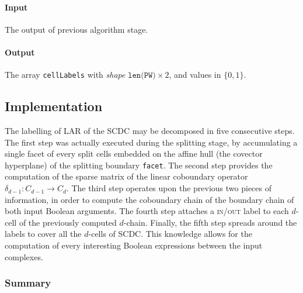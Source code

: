 \documentclass[11pt,oneside]{article}	%
\begin{document}
\paragraph{Input}
The output of previous algorithm stage.

\paragraph{Output}
The array \texttt{cellLabels} with \emph{shape} $\texttt{len(PW)}\times 2$, and values in $\{0,1\}$.


\subsection{Implementation}

The labelling of LAR of the SCDC may be decomposed in five consecutive steps. The first step was actually executed during the splitting stage, by accumulating a single facet of every split cells embedded on the affine hull (the covector hyperplane) of the splitting boundary \texttt{facet}. The second  step provides the computation of the sparse matrix of the linear coboundary operator $\delta_{d-1}: C_{d-1} \to C_d$.
The third step operates upon the previous two pieces of information, in order to compute the coboundary chain of the boundary chain of both input Boolean arguments.
The fourth step attaches a \textsc{in/out} label to each $d$-cell of the previously computed $d$-chain.
Finally, the fifth step spreads around the labels to cover all the $d$-cells of SCDC. This knowledge allows for the computation of every interesting Boolean expressions between the input complexes.

\subsubsection{Summary}
\end{document}

